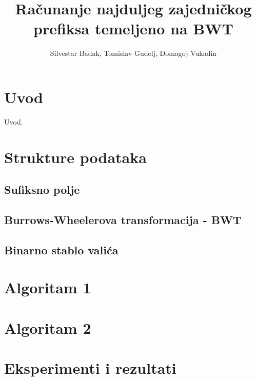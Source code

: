 \documentclass[times, utf8, seminar, numeric]{fer}
\begin{document}
\nocite{*}

\title{Računanje najduljeg zajedničkog prefiksa temeljeno na BWT}

\author{Silvestar Badak, Tomislav Gudelj, Domagoj Vukadin}


\maketitle

\tableofcontents

\chapter{Uvod}
Uvod.

\chapter{Strukture podataka}

\section {Sufiksno polje}

\section {Burrows-Wheelerova transformacija - BWT}

\section {Binarno stablo valića}

\chapter{Algoritam 1}

\chapter{Algoritam 2}

\chapter{Eksperimenti i rezultati}
\end{document}
